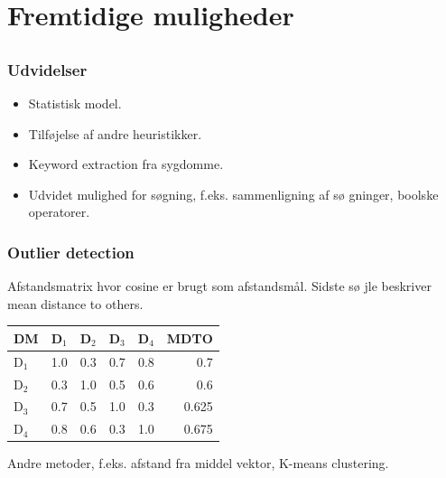 \documentclass[xcolor=table]{beamer}
\begin{document}
\section{Fremtidige muligheder}

\subsection*{}

\begin{frame}

  \frametitle{Udvidelser}

  \begin{itemize}
    \item Statistisk model.
    \item Tilf\o jelse af andre heuristikker.
    \item Keyword extraction fra sygdomme.
    \item Udvidet mulighed for s\o gning, f.eks. sammenligning af s\o
      gninger, boolske operatorer.
  \end{itemize}

\end{frame}

\begin{frame}

  \frametitle{Outlier detection}

  Afstandsmatrix hvor cosine er brugt som afstandsm\aa l. Sidste s\o
  jle beskriver mean distance to others.

  \begin{center}
    \begin{tabular}{|l|r|r|r|r|r|}
      \hline
      DM    & D$_1$ & D$_2$ & D$_3$ & D$_4$ & MDTO \\
      \hline
      D$_1$ &   1.0 &   0.3 &   0.7 &   0.8 & 0.7 \\
      \hline
      D$_2$ &   0.3 &   1.0 &   0.5 &   0.6 & 0.6 \\
      \hline
      D$_3$ &   0.7 &   0.5 &   1.0 &   0.3 & 0.625 \\
      \hline
      D$_4$ &   0.8 &   0.6 &   0.3 &   1.0 & 0.675 \\
      \hline
    \end{tabular}
  \end{center}


  Andre metoder, f.eks. afstand fra middel vektor, K-means
  clustering.

\end{frame}





\end{document}
